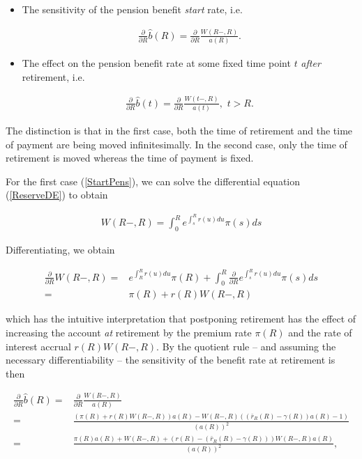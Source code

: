 \documentclass{book}
\newcommand{\1}[1]{\mathbbm{1}_{\left\lbrace #1 \right\rbrace}}
\theoremstyle{break}
\theoremstyle{remark}
\numberwithin{equation}{section}
\begin{document}
\begin{itemize}
	\item The sensitivity of the pension benefit \textit{start} rate, i.e.
	
	\begin{align} \label{StartPens}
		\frac{\partial}{\partial R} \hat{b}(R) = \frac{\partial}{\partial R} \frac{W(R-,R)}{a(R)}.
	\end{align}

	\item The effect on the pension benefit rate at some fixed time point $t$ \textit{after} retirement, i.e.
	
	\begin{align} \label{LaterPens}
		\frac{\partial}{\partial R} \hat{b}(t) = \frac{\partial}{\partial R} \frac{W(t-,R)}{a(t)}, \, \, t > R.
	\end{align}
	
\end{itemize}

The distinction is that in the first case, both the time of retirement and the time of payment are being moved infinitesimally. In the second case, only the time of retirement is moved whereas the time of payment is fixed.

For the first case (\ref{StartPens}), we can solve the differential equation (\ref{ReserveDE}) to obtain

\begin{align} \label{ReserveAtRetirement}
	W(R-,R) = \int_0^R e^{\int_s^R r(u) du} \pi(s) ds
\end{align}

Differentiating, we obtain

\begin{align*}
	\frac{\partial}{\partial R} W(R-,R) =& e^{\int_R^R r(u) du} \pi(R) + \int_0^R \frac{\partial}{\partial R} e^{\int_s^R r(u) du} \pi(s) ds \\
	=& \pi(R) + r(R) W(R-,R)
\end{align*}

which has the intuitive interpretation that postponing retirement has the effect of increasing the account \textit{at} retirement by the premium rate $\pi(R)$ and the rate of interest accrual $r(R) W(R-,R)$. By the quotient rule -- and assuming the necessary differentiability -- the sensitivity of the benefit rate at retirement is then

\begin{align} \label{hatderiv}
	\frac{\partial}{\partial R} \hat{b}(R) =& \frac{\partial}{\partial R} \frac{W(R-,R)}{a(R)} \nonumber \\
	=& \frac{\left( \pi(R) + r(R) W(R-,R) \right) a(R) - W(R-,R) \left( \left( \bar{r}_R(R) - \gamma(R) \right) a(R) - 1 \right)}{\left( a(R) \right)^2} \nonumber \\
	=& \frac{\pi(R) a(R)  + W(R-,R) + \left( r(R) - \left( \bar{r}_R(R) - \gamma(R) \right) \right) W(R-,R) a(R)}{\left( a(R) \right)^2},
\end{align}
\end{document}
